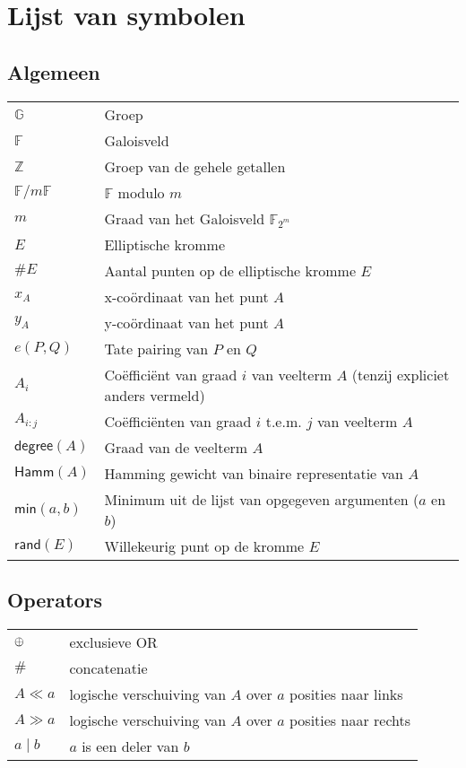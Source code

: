 \chapter*{Lijst van symbolen}

\section*{Algemeen}

\begin{tabular}{l@{$\qquad$}l}
$\mathbb{G}$	& Groep\\
$\mathbb{F}$	& Galoisveld\\
$\mathbb{Z}$	& Groep van de gehele getallen\\
$\mathbb{F}/m\mathbb{F}$	& $\mathbb{F}$ modulo $m$\\
$m$				& Graad van het Galoisveld $\mathbb{F}_{2^m}$\\
$E$				& Elliptische kromme\\
$\#E$				& Aantal punten op de elliptische kromme $E$\\
$x_A$				& x-co\"ordinaat van het punt $A$\\
$y_A$				& y-co\"ordinaat van het punt $A$\\
$e(P, Q)$		& Tate pairing van $P$ en $Q$\\
$A_i$				& Co\"effici\"ent van graad $i$ van veelterm $A$ (tenzij expliciet anders vermeld)\\
$A_{i:j}$				& Co\"effici\"enten van graad $i$ t.e.m. $j$ van veelterm $A$\\
$\textsf{degree}(A)$	& Graad van de veelterm $A$\\
$\textsf{Hamm}(A)$	& Hamming gewicht van binaire representatie van $A$\\
$\textsf{min}(a, b)$	& Minimum  uit de lijst van opgegeven argumenten ($a$ en $b$)\\
$\textsf{rand}(E)$	& Willekeurig punt op de kromme $E$\\
\end{tabular}

\section*{Operators}

\begin{tabular}{l@{$\qquad$}l}
$\oplus$	& exclusieve OR\\
$\#$		& concatenatie\\
$A \ll a$	& logische verschuiving van $A$ over $a$ posities naar links\\
$A \gg a$	& logische verschuiving van $A$ over $a$ posities naar rechts\\
$a \mid b$	& $a$ is een deler van $b$\\
\end{tabular}
